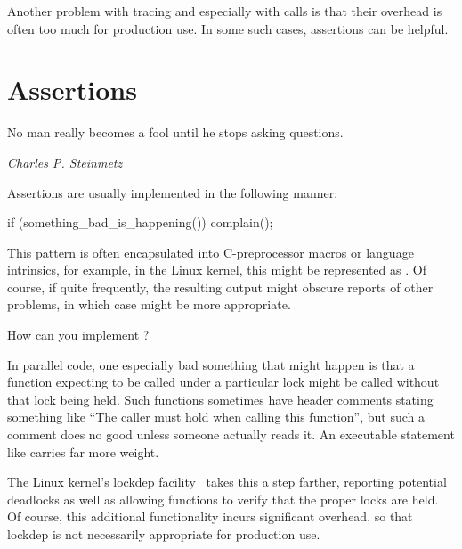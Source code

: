 Another problem with tracing and especially with  calls
is that their overhead is often too much for production use.
In some such cases, assertions can be helpful.

\section{Assertions}
\label{sec:debugging:Assertions}
%
\epigraph{No man really becomes a fool until he stops asking questions.}
	 {\emph{Charles P. Steinmetz}}

Assertions are usually implemented in the following manner:

\begin{VerbatimN}
if (something_bad_is_happening())
	complain();
\end{VerbatimN}

This pattern is often encapsulated into C-preprocessor macros or
language intrinsics, for example, in the Linux kernel, this might
be represented as .
Of course, if  quite frequently,
the resulting output might obscure reports of other problems,
in which case
 might be more appropriate.

\QuickQuiz{}
	How can you implement ?
 \QuickQuizEnd

In parallel code, one especially bad something that might happen is that
a function expecting to be called under a particular lock might be called
without that lock being held.
Such functions sometimes have header comments stating something like
``The caller must hold  when calling this function'', but
such a comment does no good unless someone actually reads it.
An executable statement like  carries far
more weight.

The Linux kernel's lockdep
facility~\cite{JonathanCorbet2006lockdep,StevenRostedt2011locdepCryptic}
takes this a step farther, reporting potential deadlocks as well as
allowing functions to verify that the proper locks are held.
Of course, this additional functionality incurs significant overhead,
so that lockdep is not necessarily appropriate for production use.


